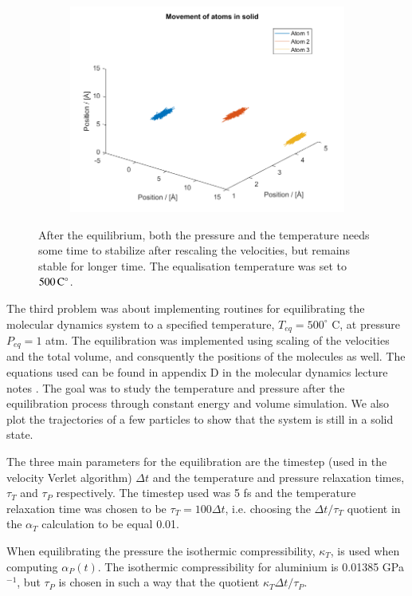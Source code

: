 \begin{figure}[H]
\begin{subfigure}[b]{0.40\textwidth}
        \includegraphics[width=\textwidth]{graphics/task3/traj.png}
    \end{subfigure}
    \caption{After the equilibrium, both the pressure and the temperature needs some time to stabilize after rescaling the velocities, but remains stable for longer time. The equalisation temperature was set to $\unit[500]{C^\circ}$.}
    \label{fig:equilibrium500}
\end{figure}

The third problem was about implementing routines for equilibrating the molecular dynamics system to a specified temperature, $T_{eq} = 500^\circ$ C, at pressure $P_{eq} = 1$ atm. The equilibration was implemented using scaling of the velocities and the total volume, and consquently the positions of the molecules as well. The equations used can be found in appendix D in the molecular dynamics lecture notes \cite{lecnotes}. The goal was to study the temperature and pressure after the equilibration process through constant energy and volume simulation. We also plot the trajectories of a few particles to show that the system is still in a solid state.

The three main parameters for the equilibration are the timestep (used in the velocity Verlet algorithm) $\Delta t$ and the temperature and pressure relaxation times, $\tau_T$ and $\tau_P$ respectively. The timestep used was 5 fs and the temperature relaxation time was chosen to be $\tau_T = 100 \Delta t$, i.e. choosing the $\Delta t/\tau_T$ quotient in the $\alpha_T$ calculation to be equal 0.01.

When equilibrating the pressure the isothermic compressibility, $\kappa_T$, is used when computing $\alpha_P(t)$. The isothermic compressibility for aluminium is 0.01385 GPa$^{-1}$, but $\tau_P$ is chosen in such a way that the quotient $\kappa_T \Delta t / \tau_P$.

